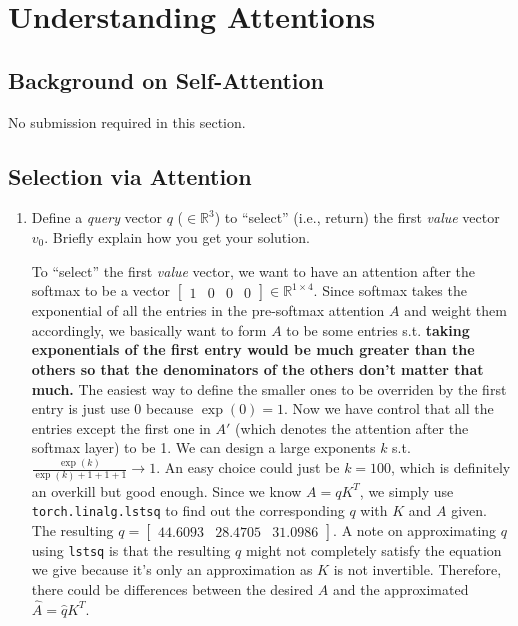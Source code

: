 \documentclass{article}
\newenvironment{solution}{\color{blue}}{}
\begin{document}
\section{Understanding Attentions}
\subsection{Background on Self-Attention}
\begin{solution}
  No submission required in this section.
\end{solution}

\subsection{Selection via Attention}
\begin{enumerate}
  \item Define a \textit{query} vector $q$ ($\in \mathbb{R}^3$) to ``select'' (i.e., return) the first \textit{value} vector $v_0$. Briefly explain how you get your solution.
  
  \begin{solution}
    To ``select'' the first \textit{value} vector, we want to have an attention after 
    the softmax to be a vector $\begin{bmatrix}
      1 & 0 & 0 & 0
    \end{bmatrix} \in \mathbb{R}^{1 \times 4}$. Since softmax takes the exponential of all the entries in the pre-softmax attention $A$ and weight them accordingly, we basically want to form $A$ to be some entries s.t. \textbf{taking exponentials of the first entry would be much greater than the others so that the denominators of the others don't matter that much.} The easiest way to define the smaller ones to be overriden by the first entry is just use 0 because $\exp(0) = 1$. Now we have control that all the entries except the first one in $A'$ (which denotes the attention after the softmax layer) to be 1. We can design a large exponents $k$ s.t. $\frac{\exp(k)}{\exp(k) + 1 + 1 + 1} \rightarrow 1$. An easy choice could just be $k=100$, which is definitely an overkill but good enough. Since we know $A = q K^T$, we simply use \texttt{torch.linalg.lstsq} to find out the corresponding $q$ with $K$ and $A$ given. The resulting $q = \begin{bmatrix}
      44.6093 & 28.4705 & 31.0986
    \end{bmatrix}$. A note on approximating $q$ using \texttt{lstsq} is that the resulting $q$ might not completely satisfy the equation we give because it's only an approximation as $K$ is not invertible. Therefore, there could be differences between the desired $A$ and the approximated $\hat{A} = \hat{q} K^T$.
  \end{solution}


\end{enumerate}
\end{document}
